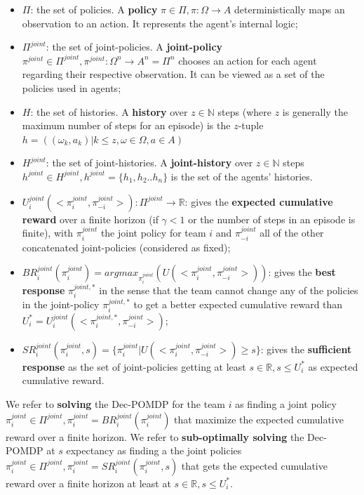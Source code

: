 \documentclass[pdflatex,sn-mathphys-num]{sn-jnl}%
\theoremstyle{thmstyleone}%
\theoremstyle{thmstyletwo}%
\theoremstyle{thmstylethree}%
\begin{document}
\begin{itemize}

    \item $\Pi$: the set of policies. A \textbf{policy} $\pi \in \Pi, \pi: \Omega \rightarrow A$ deterministically maps an observation to an action. It represents the agent's internal logic;
    \item $\Pi^{joint}$: the set of joint-policies. A \textbf{joint-policy} $\pi^{joint} \in \Pi^{joint}, \pi^{joint}: \Omega^n \rightarrow A^n = \Pi^n$ chooses an action for each agent regarding their respective observation. It can be viewed as a set of the policies used in agents;
    \item $H$: the set of histories. A \textbf{history} over $z \in \mathbb{N}$ steps (where $z$ is generally the maximum number of steps for an episode) is the $z$-tuple $h = ((\omega_{k}, a_{k}) | k \leq z, \omega \in \Omega, a \in A)$
    \item $H^{joint}$: the set of joint-histories. A \textbf{joint-history} over $z \in \mathbb{N}$ steps $h^{joint} \in H^{joint}, h^{joint} = \{h_1,h_2..h_n\}$ is the set of the agents' histories.
    \item $U^{joint}_{i}(<\pi^{joint}_{i}, \pi^{joint}_{-i}>): \Pi^{joint} \rightarrow \mathbb{R}$: gives the \textbf{expected cumulative reward} over a finite horizon (if $\gamma < 1$ or the number of steps in an episode is finite), with $\pi^{joint}_{i}$ the joint policy for team $i$ and $\pi^{joint}_{-i}$ all of the other concatenated joint-policies (considered as fixed);
    \item $BR^{joint}_{i}(\pi^{joint}_{i}) = argmax_{\pi^{joint}_{i}}(U(<\pi^{joint}_{i},\pi^{joint}_{-i}>))$: gives the \textbf{best response} $\pi^{joint,*}_{i}$ in the sense that the team cannot change any of the policies in the joint-policy $\pi^{joint,*}_{i}$ to get a better expected cumulative reward than $U_i^* = U^{joint}_{i}(<\pi^{joint,*}_{i}, \pi^{joint}_{-i}>)$;
    \item $SR^{joint}_{i}(\pi^{joint}_{i}, s) = \{\pi^{joint}_{i} | U(<\pi^{joint}_{i},\pi^{joint}_{-i}>) \geq s\}$: gives the \textbf{sufficient response} as the set of joint-policies getting at least $s \in \mathbb{R}, s \leq U_i^*$ as expected cumulative reward.
\end{itemize}

\noindent We refer to \textbf{solving} the Dec-POMDP for the team $i$ as finding a joint policy $\pi^{joint}_{i} \in \Pi^{joint}, \pi^{joint}_{i} = BR^{joint}_{i}(\pi^{joint}_{i})$ that maximize the expected cumulative reward over a finite horizon.
We refer to \textbf{sub-optimally solving} the Dec-POMDP at $s$ expectancy as finding a the joint policies $\pi^{joint}_{i} \in \Pi^{joint}, \pi^{joint}_{i} = SR^{joint}_{i}(\pi^{joint}_{i}, s)$ that gets the expected cumulative reward over a finite horizon at least at $s \in \mathbb{R}, s \leq U_i^*$.
\end{document}
